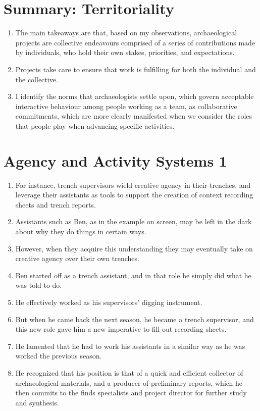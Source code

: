 \documentclass{article}
\begin{document}
\section{Summary: Territoriality}
\begin{enumerate}
  \item The main takeaways are that, based on my observations, archaeological projects are collective endeavours comprised of a series of contributions made by individuals, who hold their own stakes, priorities, and expectations.
  \item Projects take care to ensure that work is fulfilling for both the individual and the collective.
  \item I identify the norms that archaeologists settle upon, which govern acceptable interactive behaviour among people working as a team, as collaborative commitments, which are more clearly manifested when we consider the roles that people play when advancing specific activities.
\end{enumerate}

\section{Agency and Activity Systems 1}
\begin{enumerate}
  \item For instance, trench supervisors wield creative agency in their trenches, and leverage their assistants as tools to support the creation of context recording sheets and trench reports.
  \item Assistants such as Ben, as in the example on screen, may be left in the dark about why they do things in certain ways.
  \item However, when they acquire this understanding they may eventually take on creative agency over their own trenches.
  \item Ben started off as a trench assistant, and in that role he simply did what he was told to do.
  \item He effectively worked as his supervisors' digging instrument.
  \item But when he came back the next season, he became a trench supervisor, and this new role gave him a new imperative to fill out recording sheets.
  \item He lamented that he had to work his assistants in a similar way as he was worked the previous season.
  \item He recognized that his position is that of a quick and efficient collector of archaeological materials, and a producer of preliminary reports, which he then commits to the finds specialists and project director for further study and synthesis.
\end{enumerate}
\end{document}
